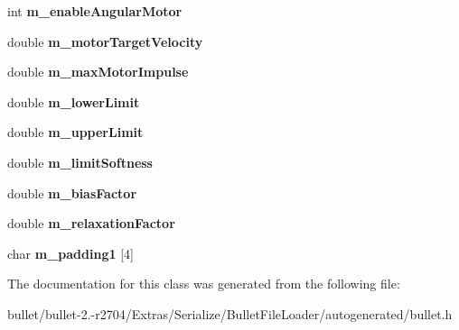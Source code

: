 \begin{DoxyCompactItemize}
\item 
\hypertarget{class_bullet_1_1bt_hinge_constraint_double_data2_adaae25ba833a650907076dd9a5223598}{int {\bfseries m\+\_\+enable\+Angular\+Motor}}\label{class_bullet_1_1bt_hinge_constraint_double_data2_adaae25ba833a650907076dd9a5223598}

\item 
\hypertarget{class_bullet_1_1bt_hinge_constraint_double_data2_aea9dbacc87c153e56c9344c57464292c}{double {\bfseries m\+\_\+motor\+Target\+Velocity}}\label{class_bullet_1_1bt_hinge_constraint_double_data2_aea9dbacc87c153e56c9344c57464292c}

\item 
\hypertarget{class_bullet_1_1bt_hinge_constraint_double_data2_aee80735c66cb1d2d8b006620c8f68496}{double {\bfseries m\+\_\+max\+Motor\+Impulse}}\label{class_bullet_1_1bt_hinge_constraint_double_data2_aee80735c66cb1d2d8b006620c8f68496}

\item 
\hypertarget{class_bullet_1_1bt_hinge_constraint_double_data2_acbeb5334cc2cc54471265f021319be85}{double {\bfseries m\+\_\+lower\+Limit}}\label{class_bullet_1_1bt_hinge_constraint_double_data2_acbeb5334cc2cc54471265f021319be85}

\item 
\hypertarget{class_bullet_1_1bt_hinge_constraint_double_data2_a8fdf1a7b9f399f91635c83a7bbb9f91c}{double {\bfseries m\+\_\+upper\+Limit}}\label{class_bullet_1_1bt_hinge_constraint_double_data2_a8fdf1a7b9f399f91635c83a7bbb9f91c}

\item 
\hypertarget{class_bullet_1_1bt_hinge_constraint_double_data2_a935a87badd874483e132fe6f11e96df1}{double {\bfseries m\+\_\+limit\+Softness}}\label{class_bullet_1_1bt_hinge_constraint_double_data2_a935a87badd874483e132fe6f11e96df1}

\item 
\hypertarget{class_bullet_1_1bt_hinge_constraint_double_data2_ad738f4604bf44809f829748ef8e28c63}{double {\bfseries m\+\_\+bias\+Factor}}\label{class_bullet_1_1bt_hinge_constraint_double_data2_ad738f4604bf44809f829748ef8e28c63}

\item 
\hypertarget{class_bullet_1_1bt_hinge_constraint_double_data2_a97fbc7b8689fbb2ff6d90ace7a1ab15b}{double {\bfseries m\+\_\+relaxation\+Factor}}\label{class_bullet_1_1bt_hinge_constraint_double_data2_a97fbc7b8689fbb2ff6d90ace7a1ab15b}

\item 
\hypertarget{class_bullet_1_1bt_hinge_constraint_double_data2_a3bc459cb271ef21985da18c8e9a4cb78}{char {\bfseries m\+\_\+padding1} \mbox{[}4\mbox{]}}\label{class_bullet_1_1bt_hinge_constraint_double_data2_a3bc459cb271ef21985da18c8e9a4cb78}

\end{DoxyCompactItemize}


The documentation for this class was generated from the following file\+:\begin{DoxyCompactItemize}
\item 
bullet/bullet-\/2.-\/r2704/\+Extras/\+Serialize/\+Bullet\+File\+Loader/autogenerated/bullet.\+h\end{DoxyCompactItemize}
